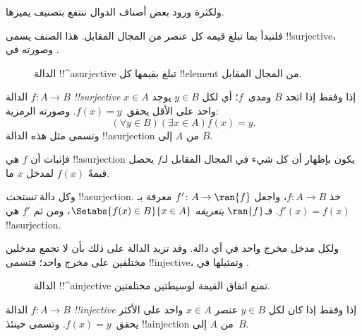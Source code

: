 \documentclass[../../../include/open-logic-section]{subfiles}
\begin{document}

\begin{explain}
ولكثرة ورود بعض أصناف الدوال ننتفع بتصنيف يميزها.

فلنبدأ بما تبلغ قيمه كل عنصر من المجال المقابل. هذا الصنف
يسمى !!{surjective}، وصورته في .

\begin{figure}
  \caption{الدالة !!^a{surjective} تبلغ بقيمها كل !!{element} من المجال المقابل.}
\end{figure}
\end{explain}

\begin{defn}
الدالة $f \colon A \rightarrow B$ \emph{!!{surjective}} إذا وفقط إذا
اتحد $B$ ومدى~$f$؛ أي لكل $y \in B$ يوجد $x \in A$ واحد على الأقل
يحقق~$f(x) = y$. وصورته الرمزية:
\[
  (\forall y \in B)(\exists x \in A)f(x) = y.
\]
وتسمى مثل هذه الدالة !!a{surjection} من $A$ إلى $B$.
\end{defn}

\begin{explain}
فإثبات أن $f$ هي !!a{surjection} يكون بإظهار أن كل شيء في المجال
المقابل لـ$f$ يحصل قيمةً $f(x)$ لمدخل $x$ ما.

وكل دالة \emph{تستحث} !!a{surjection}. خذ $f \colon A \to B$،
واجعل $f' \colon A \to \ran{f}$ معرفة بـ$f'(x) = f(x)$.
فـ$\ran{f}$ \emph{بتعريفه} $\Setabs{f(x) \in B}{x \in A}$،
ومن ثم $f'$ هي !!a{surjection}.
\end{explain}

\begin{explain}
ولكل مدخل مخرج واحد في أي دالة. وقد تزيد الدالة على ذلك بأن
لا تجمع مدخلين مختلفين على مخرج واحد؛ فتسمى !!{injective}،
وتمثيلها في .
\begin{figure}
  \caption{الدالة !!^a{injective} تمنع اتفاق القيمة لوسيطتين مختلفتين.}
\end{figure}
\end{explain}

\begin{defn}
الدالة $f \colon A \rightarrow B$ \emph{!!{injective}} إذا وفقط إذا
كان لكل $y \in B$ عنصر $x \in A$ واحد على الأكثر يحقق~$f(x) = y$.
وتسمى حينئذ !!a{injection} من $A$ إلى~$B$.
\end{defn}
\end{document}
